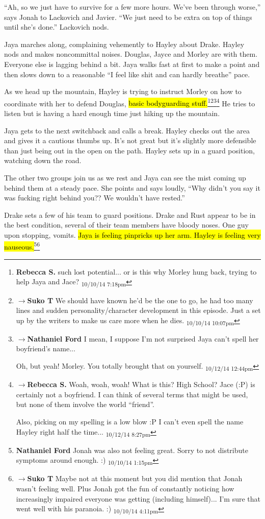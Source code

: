 ``Ah, so we just have to survive for a few more hours.  We've been through worse,'' says Jonah to Lackovich and Javier.  ``We just need to be extra on top of things until she's done.''  Lackovich nods.



Jaya marches along, complaining vehemently to Hayley about Drake.  Hayley nods and makes noncommittal noises.  Douglas, Jayce and Morley are with them.  Everyone else is lagging behind a bit.  Jaya walks fast at first to make a point and then slows down to a reasonable ``I feel like shit and can hardly breathe'' pace.

As we head up the mountain, Hayley is trying to instruct Morley on how to coordinate with her to defend Douglas, \hl{basic bodyguarding stuff.}\footnote{\textbf{Rebecca S. }such lost potential... or is this why Morley hung back, trying to help Jaya and Jace? \textsubscript{10/10/14 7:18pm}}\footnote{$\rightarrow$\textbf{Suko T }We should have known he'd be the one to go, he had too many lines and sudden personality/character development in this episode.  Just a set up by the writers to make us care more when he dies. \textsubscript{10/10/14 10:07pm}}\footnote{$\rightarrow$\textbf{Nathaniel Ford }I mean, I suppose I'm not surprised Jaya can't spell her boyfriend's name...

Oh, but yeah! Morley. You totally brought that on yourself. \textsubscript{10/12/14 12:44pm}}\footnote{$\rightarrow$\textbf{Rebecca S. }Woah, woah, woah! What is this? High School?  Jace (:P) is certainly not a boyfriend. I can think of several terms that might be used, but none of them involve the world ``friend''.  

Also, picking on my spelling is a low blow :P  I can't even spell the name Hayley right half the time... \textsubscript{10/12/14 8:27pm}}  He tries to listen but is having a hard enough time just hiking up the mountain.

Jaya gets to the next switchback and calls a break.  Hayley checks out the area and gives it a cautious thumbs up.  It's not great but it's slightly more defensible than just being out in the open on the path.  Hayley sets up in a guard position, watching down the road.  

The other two groups join us as we rest and Jaya can see the mist coming up behind them at a steady pace.  She points and says loudly, ``Why didn't you say it was fucking right behind you??  We wouldn't have rested.''

Drake sets a few of his team to guard positions.  Drake and Rust appear to be in the best condition, several of their team members have bloody noses.  One guy upon stopping, vomits.  \hl{Jaya is feeling pinpricks up her arm.  Hayley is feeling very nauseous.}\footnote{\textbf{Nathaniel Ford }Jonah was also not feeling great. Sorry to not distribute symptoms around enough. :) \textsubscript{10/10/14 1:15pm}}\footnote{$\rightarrow$\textbf{Suko T }Maybe not at this moment but you did mention that Jonah wasn't feeling well.  Plus Jonah got the fun of constantly noticing how increasingly impaired everyone was getting (including himself)... I'm sure that went well with his paranoia. :) \textsubscript{10/10/14 4:11pm}}




